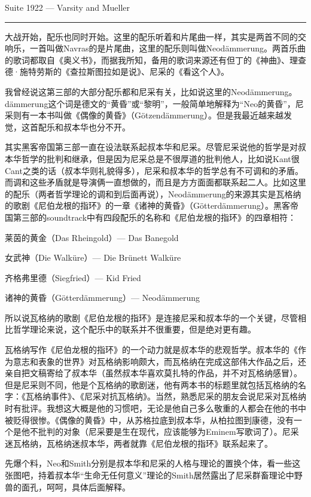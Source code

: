 \documentclass[UTF8]{ctexart}
\newcommand{\myparsep}{\noindent \rule[0.5ex]{\linewidth}{1pt}}
\begin{document}
Suite 1922 --- Varsity and Mueller

\myparsep

大战开始，配乐也同时开始。这里的配乐听着和片尾曲一样，其实是两首不同的交响乐，一首叫做Navras的是片尾曲，这里的配乐则叫做Neodämmerung。两首乐曲的歌词都取自《奥义书》，而据我所知，备用的歌词来源还有但丁的《神曲》、理查德·施特劳斯的《查拉斯图拉如是说》、尼采的《看这个人》。

我曾经说这第三部的大部分配乐都和尼采有关，比如说这里的Neodämmerung。dämmerung这个词是德文的“黄昏”或“黎明”，一般简单地解释为“Neo的黄昏”，尼采则有一本书叫做《偶像的黄昏》（Götzendämmerung）。但是我最近越来越发觉，这首配乐和叔本华也分不开。

其实黑客帝国第三部一直在设法联系起叔本华和尼采。尽管尼采说他的哲学是对叔本华哲学的批判和继承，但是因为尼采总是不很厚道的批判他人，比如说Kant很Cant之类的话（叔本华则礼貌得多），尼采和叔本华的哲学总有不可调和的矛盾。而调和这些矛盾就是导演俩一直想做的，而且是方方面面都联系起二人。比如这里的配乐（两者哲学理论的调和到后面再说），Neodämmerung的来源其实是瓦格纳的歌剧《尼伯龙根的指环》的一章《诸神的黄昏》（Götterdämmerung‎）。黑客帝国第三部的soundtrack中有四段配乐的名称和《尼伯龙根的指环》的四章相符：

莱茵的黄金（Das Rheingold‎）--- Das Banegold

女武神（Die Walküre‎）--- Die Brünett Walküre

齐格弗里德（Siegfried‎）--- Kid Fried

诸神的黄昏（Götterdämmerung‎）--- Neodämmerung

所以说瓦格纳的歌剧《尼伯龙根的指环》是连接尼采和叔本华的一个关键，尽管相比哲学理论来说，这个配乐中的联系并不很重要，但是绝对更有趣。

瓦格纳写作《尼伯龙根的指环》的一个动力就是叔本华的悲观哲学。叔本华的《作为意志和表象的世界》对瓦格纳影响颇大，而瓦格纳在完成这部伟大作品之后，还亲自把文稿寄给了叔本华（虽然叔本华喜欢莫扎特的作品，并不对瓦格纳感冒）。但是尼采则不同，他是个瓦格纳的歌剧迷，他有两本书的标题里就包括瓦格纳的名字：《瓦格纳事件》、《尼采对抗瓦格纳》。当然，熟悉尼采的朋友会说尼采对瓦格纳时有批评。我想这大概是他的习惯吧，无论是他自己多么敬重的人都会在他的书中被贬得很惨。《偶像的黄昏》中，从苏格拉底到叔本华，从柏拉图到康德，没有一个是他不批判的对象（尼采要是生在现代，应该能够为Eminem写歌词了）。尼采迷瓦格纳，瓦格纳迷叔本华，两者就靠《尼伯龙根的指环》联系起来了。

先爆个料，Neo和Smith分别是叔本华和尼采的人格与理论的置换个体，看一些这张图吧，持着叔本华“生命无任何意义”理论的Smith居然露出了尼采群畜理论中野兽的面孔，呵呵，具体后面解释。
\end{document}
